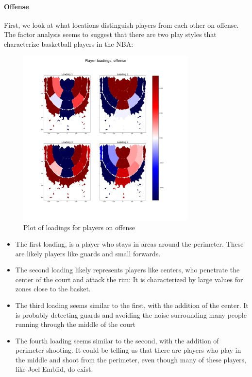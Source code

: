 \documentclass[]{article}
\let\oldparagraph\paragraph
\renewcommand{\paragraph}[1]{\oldparagraph{#1}\mbox{}}
\begin{document}
\hypertarget{offense}{%
\paragraph{Offense}\label{offense}}

First, we look at what locations distinguish players from each other on
offense. The factor analysis seems to suggest that there are two play
styles that characterize basketball players in the NBA:

\begin{figure}
\centering
\includegraphics[width=0.8\textwidth,height=\textheight]{first_4_loadings_players_off.png}
\caption{Plot of loadings for players on offense}
\end{figure}

\begin{itemize}
\item
  The first loading, is a player who stays in areas around the
  perimeter. These are likely players like guards and small forwards.
\item
  The second loading likely represents players like centers, who
  penetrate the center of the court and attack the rim: It is
  characterized by large values for zones close to the basket.
\item
  The third loading seems similar to the first, with the addition of the
  center. It is probably detecting guards and avoiding the noise
  surrounding many people running through the middle of the court
\item
  The fourth loading seems similar to the second, with the addition of
  perimeter shooting. It could be telling us that there are players who
  play in the middle and shoot from the perimeter, even though many of
  these players, like Joel Embiid, do exist.
\end{itemize}
\end{document}
